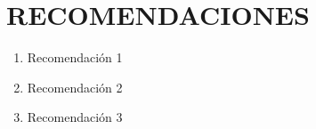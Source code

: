 \cleardoublepage{}
\chapter*{RECOMENDACIONES}
%
\begin{enumerate}

\item Recomendación 1

\item Recomendación 2

\item Recomendación 3

\end{enumerate}